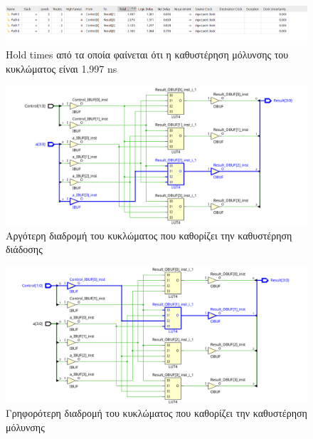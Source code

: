 \documentclass[11pt, a4paper]{report}
\begin{document}
\begin{figure}
  \includegraphics[width=\textwidth]{./images/alu-2/fast-report.png}
  \caption{Hold times από τα οποία φαίνεται ότι η καθυστέρηση μόλυνσης του κυκλώματος είναι 1.997 ns}
  \label{fig:fast}
\end{figure}

\begin{figure}
  \includegraphics[width=\textwidth]{./images/alu-2/slow-path.png}
  \caption{Αργότερη διαδρομή του κυκλώματος που καθορίζει την καθυστέρηση διάδοσης}
  \label{fig:slow_path}
\end{figure}

\begin{figure}
  \includegraphics[width=\textwidth]{./images/alu-2/fast-path.png}
  \caption{Γρηφορότερη διαδρομή του κυκλώματος που καθορίζει την καθυστέρηση μόλυνσης}
  \label{fig:fast_path}
\end{figure}
\end{document}
